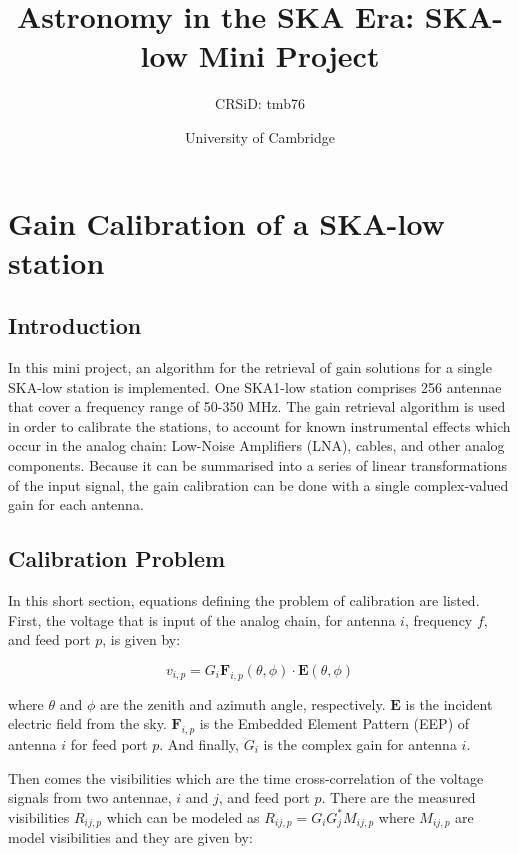 \documentclass[12pt]{report} %
\title{Astronomy in the SKA Era: SKA-low Mini Project}
\author{CRSiD: tmb76}
\date{University of Cambridge}
\begin{document}
\maketitle

\tableofcontents

\chapter*{Gain Calibration of a SKA-low station}

\section{Introduction}

In this mini project, an algorithm for the retrieval of gain solutions for a single SKA-low station is implemented. One SKA1-low station comprises 256 antennae that cover a frequency range of 50-350 MHz. The gain retrieval algorithm is used in order to calibrate the stations, to account for known instrumental effects which occur in the analog chain: Low-Noise Amplifiers (LNA), cables, and other analog components. Because it can be summarised into a series of linear transformations of the input signal, the gain calibration can be done with a single complex-valued gain for each antenna.

\section{Calibration Problem}

In this short section, equations defining the problem of calibration are listed. First, the voltage that is input of the analog chain, for antenna $i$, frequency $f$, and feed port $p$, is given by:

\begin{equation}
    v_{i, p} = G_{i} \mathbf{F}_{i,p}(\theta, \phi) \cdot \mathbf{E}(\theta, \phi)
\end{equation}

where $\theta$ and $\phi$ are the zenith and azimuth angle, respectively. $\mathbf{E}$ is the incident electric field from the sky. $\mathbf{F}_{i,p}$ is the Embedded Element Pattern (EEP) of antenna $i$ for feed port $p$. And finally, $G_{i}$ is the complex gain for antenna $i$.

Then comes the visibilities which are the time cross-correlation of the voltage signals from two antennae, $i$ and $j$, and feed port $p$. There are the measured visibilities $R_{ij,p}$ which can be modeled as $R_{ij,p} = G_{i}G^{*}_{j}M_{ij,p}$ where $M_{ij,p}$ are model visibilities and they are given by:
\end{document}
